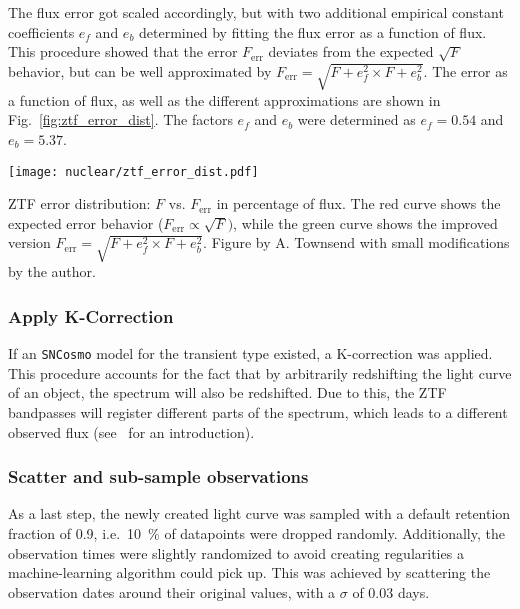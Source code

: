 The flux error got scaled accordingly, but with two additional empirical constant coefficients $e_f$ and $e_b$ determined by fitting the flux error as a function of flux. This procedure showed that the error $F_\text{err}$ deviates from the expected $\sqrt{F}$ behavior, but can be well approximated by $F_\text{err} = \sqrt{F + e_f^2\times F + e_b^2}$. The error as a function of flux, as well as the different approximations are shown in Fig.~\ref{fig:ztf_error_dist}. The factors $e_f$ and $e_b$ were determined as $e_f = 0.54$ and $e_b = 5.37$.

\begin{marginfigure}
  \texttt{[image: nuclear/ztf\_error\_dist.pdf]}
  \caption[ZTF error distribution]{ZTF error distribution: $F$ vs. $F_\text{err}$ in percentage of flux. The red curve shows the expected error behavior ($F_\text{err}\propto \sqrt{F})$, while the green curve shows the improved version $F_\text{err} = \sqrt{F + e_f^2\times F + e_b^2}$. Figure by A. Townsend with small modifications by the author.}
\end{marginfigure}

\subsubsection{Apply K-Correction}
If an \texttt{SNCosmo} model for the transient type existed, a K-correction was applied. This procedure accounts for the fact that by arbitrarily redshifting the light curve of an object, the spectrum will also be redshifted. Due to this, the ZTF bandpasses will register different parts of the spectrum, which leads to a different observed flux (see~ for an introduction).

\subsubsection{Scatter and sub-sample observations}
As a last step, the newly created light curve was sampled with a default retention fraction of 0.9, i.e.~\SI{10}{\percent} of datapoints were dropped randomly. Additionally, the observation times were slightly randomized to avoid creating regularities a machine-learning algorithm could pick up. This was achieved by scattering the observation dates around their original values, with a $\sigma$ of $0.03$ days.

